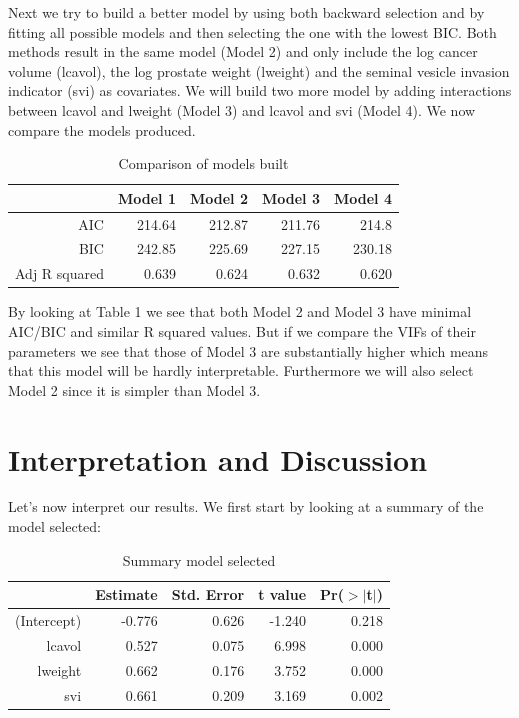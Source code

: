 \documentclass[10pt]{article}
\begin{document}
Next we try to build a better model by using both backward selection and by fitting all possible models and then selecting the one with the lowest BIC. Both methods result in the same model (Model 2) and only include the log cancer volume (lcavol), the log prostate weight (lweight) and the seminal vesicle invasion indicator (svi) as covariates. We will build two more model by adding interactions between lcavol and lweight (Model 3) and lcavol and svi (Model 4). We now compare the models produced.

\begin{table}[ht]
\centering
\caption{Comparison of models built} \label{criteriontable}
\begin{tabular}{rrrrr}
  \hline
 & Model 1 & Model 2 & Model 3 & Model 4 \\ 
  \hline
AIC & 214.64 & 212.87 & 211.76 & 214.8 \\ 
BIC & 242.85 & 225.69 & 227.15 & 230.18 \\ 
Adj R squared & 0.639 & 0.624 & 0.632 & 0.620 \\ 
  \hline
\end{tabular}
\end{table}

By looking at Table 1 we see that both Model 2 and Model 3 have minimal AIC/BIC and similar R squared values. But if we compare the VIFs of their parameters we see that those of Model 3 are substantially higher which means that this model will be hardly interpretable. Furthermore we will also select Model 2 since it is simpler than Model 3.

\section{Interpretation and Discussion}

\quad Let's now interpret our results. We first start by looking at a summary of the model selected:

\begin{table}[ht]
\centering
\caption{Summary model selected} \label{summary}
\begin{tabular}{rrrrr}
  \hline
 & Estimate & Std. Error & t value & Pr($>$$|$t$|$) \\ 
  \hline
(Intercept) & -0.776 & 0.626 & -1.240 & 0.218 \\ 
  lcavol & 0.527 & 0.075 & 6.998 & 0.000 \\ 
  lweight & 0.662 & 0.176 & 3.752 & 0.000 \\ 
  svi & 0.661 & 0.209 & 3.169 & 0.002 \\ 
   \hline
\end{tabular}
\end{table}
\end{document}

